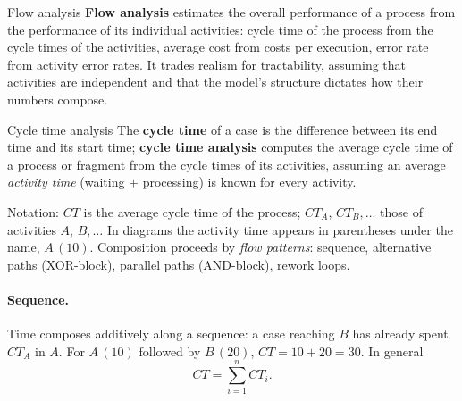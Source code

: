 \begin{definitionbox}{Flow analysis}
\textbf{Flow analysis} estimates the overall performance of a process from the performance of its individual activities: cycle time of the process from the cycle times of the activities, average cost from costs per execution, error rate from activity error rates. It trades realism for tractability, assuming that activities are independent and that the model's structure dictates how their numbers compose.
\end{definitionbox}
\begin{definitionbox}{Cycle time analysis}
The \textbf{cycle time} of a case is the difference between its end time and its start time; \textbf{cycle time analysis} computes the average cycle time of a process or fragment from the cycle times of its activities, assuming an average \emph{activity time} (waiting $+$ processing) is known for every activity.
\end{definitionbox}
Notation: $CT$ is the average cycle time of the process; $CT_A$, $CT_B, \ldots$ those of activities $A$, $B, \ldots$ In diagrams the activity time appears in parentheses under the name, $A\,(10)$. Composition proceeds by \emph{flow patterns}: sequence, alternative paths (XOR-block), parallel paths (AND-block), rework loops.

\paragraph{Sequence.} Time composes additively along a sequence: a case reaching $B$ has already spent $CT_A$ in $A$. For $A\,(10)$ followed by $B\,(20)$, $CT = 10 + 20 = 30$. In general
$$CT = \sum_{i=1}^{n} CT_i.$$

